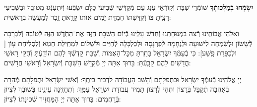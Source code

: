 \documentclass[twoside, openany, parskip=half, 11pt]{book}
\begin{document}
\begin{sometimes}
\textbf{יִשְׂמְֿחוּ בְֿמַלְכוּתְֿךָ}
שׁוֹמְֿרֵי שַׁבָּת וְֿקֽוֹרְֿאֵי עֹֽנֶג עַם מְֿקַדְּֿשֵׁי שְֿׁבִיעִי כֻּלָּם יִשְׂבְּֿעוּ וְֿיִתְעַנְּֿגוּ מִטּוּבֶֽךָ וּבַשְּֿׁבִיעִי רָצִֽיתָ בּוֹ וְֿקִדַּשְׁתּוֹ חֶמְדַּת יָמִים אוֹתוֹ קָרָֽאתָ זֵֽכֶר לְֿמַעֲשֵׂה בְֿרֵאשִׁית:

 וֵאלֹהֵי אֲבוֹתֵֽינוּ רְֿצֵה בִמְנוּחָתֵֽנוּ וְֿחַדֵּשׁ עָלֵֽינוּ בְּֿיוֹם הַשַּׁבָּת הַזֶּה אֶת־הַחֹֽדֶשׁ הַזֶּה לְֿטוֹבָה וְֿלִבְרָכָה לְֿשָׂשׂוֹן וּלְשִׂמְחָה לִישׁוּעָה וּלְנֶחָמָה לְֿפַרְנָסָה וּלְכַלְכָּלָה לְֿחַיִּים וּלְשָׁלוֹם לִמְחִֽילַת חֵטְא וְֿלִסְלִיחַת עָוֹן [
וּלְכַפָּרַת פָּֽשַׁע]: כִּי בְֿעַמְּֿךָ יִשְׂרָאֵל בָּחַֽרְתָּ מִכׇּל־הָאֻמּוֹת וְֿשַׁבַּת קׇדְשְֿׁךָ לָהֶם הוֹדָֽעְֿתָּ וְֿחֻקֵּי רָאשֵׁי חֳדָשִׁים לָהֶם קָבָֽעְֿתָּ: בָּרוּךְ אַתָּה יְיָ מְֿקַדֵּשׁ הַשַּׁבָּת וְֿיִשְׂרָאֵל וְֿרָאשֵׁי חֳדָשִׁים: 

\end{sometimes}

יְיָ אֱלֹהֵֽינוּ בְּֿעַמְּֿךָ יִשְׂרָאֵל וּבִתְפִלָּתָם וְֿהָשֵׁב הָעֲבוֹדָה לִדְבִיר בֵּיתֶֽךָ: וְֿאִשֵּׁי יִשְׂרָאֵל וּתְפִלָּתָם מְֿהֵרָה בְּֿאַהֲבָה תְֿקַבֵּל בְּֿרָצוֹן וּתְהִי לְֿרָצוֹן תָּמִיד עֲבוֹדַת יִשְׂרָאֵל עַמֶּֽךָ: וְֿתֶחֱזֶֽינָה עֵינֵֽינוּ בְּֿשׁוּבְֿךָ לְֿצִיּוֹן בְּֿרַחֲמִים:
בָּרוּךְ אַתָּה יְיָ הַמַּחֲזִיר שְֿׁכִינָתוֹ לְֿצִיּוֹן:

\modim

\nextpage

\shabboschanukah

\shabboshodos

\vspace{.5\baselineskip}
\end{document}
